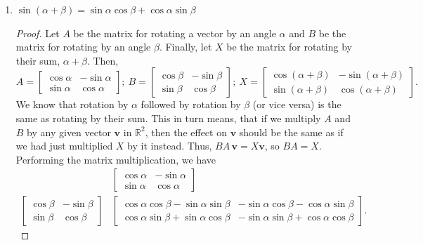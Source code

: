 \documentclass{article}
\begin{document}
\begin{enumerate}
\begin{enumerate}
        \item \(\sin(\alpha + \beta) = \sin\alpha\cos\beta + \cos\alpha\sin\beta\)\begin{proof}
            Let \(A\) be the matrix for rotating a vector by an angle \(\alpha\) and \(B\) be the matrix for rotating by an angle \(\beta\). Finally, let \(X\) be the matrix for rotating by their sum, \(\alpha + \beta\). Then,\[
                A = \begin{bmatrix}
                    \cos\alpha&-\sin\alpha \\ \sin\alpha&\cos\alpha
                \end{bmatrix};~B = \begin{bmatrix}
                    \cos\beta&-\sin\beta \\ \sin\beta&\cos\beta
                \end{bmatrix};~X =  \begin{bmatrix}
                    \cos(\alpha + \beta)&-\sin(\alpha + \beta) \\ \sin(\alpha+\beta)&\cos(\alpha + \beta)
                \end{bmatrix}.
            \] We know that rotation by \(\alpha\) followed by rotation by \(\beta\) (or vice versa) is the same as rotating by their sum. This in turn means, that if we multiply \(A\) and \(B\) by any given vector \(\mathbf{v}\) in \(\mathbb{R}^2\), then the effect on \(\mathbf{v}\)
            should be the same as if we had just multiplied \(X\) by it instead. Thus, \(BA\,\mathbf{v} = X\mathbf{v}\), so \(BA = X\). Performing the matrix multiplication, we have\begin{align*}
                &\begin{bmatrix}
                    \cos\alpha&-\sin\alpha \\ \sin\alpha&\cos\alpha
                \end{bmatrix} \\
                \begin{bmatrix}
                    \cos\beta&-\sin\beta \\ \sin\beta&\cos\beta
                \end{bmatrix} & \begin{bmatrix}
                    \cos\alpha\cos\beta - \sin\alpha\sin\beta&-\sin\alpha\cos\beta-\cos\alpha\sin\beta \\ 
                    \cos\alpha\sin\beta + \sin\alpha\cos\beta& -\sin\alpha\sin\beta + \cos\alpha\cos\beta
                \end{bmatrix}.

\end{align*}
\end{proof}
\end{enumerate}
\end{enumerate}
\end{document}
